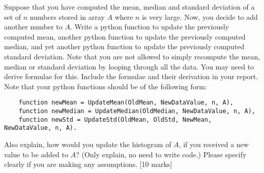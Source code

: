 \begin{que}
	Suppose that you have computed the mean, median and standard deviation of a
	set of $n$ numbers stored in array $A$ where $n$ is very large. Now, you decide
	to add another number to $A$. Write a python function to update the
	previously computed mean, another python function to update the previously
	computed median, and yet another python function to update the previously
	computed standard deviation. Note that you are not allowed to simply
	recompute the mean, median or standard deviation by looping through all the
	data. You may need to derive formulae for this. Include the formulae and
	their derivation in your report. Note that your python functions should be
	of the following form:

	\begin{verbatim}
	function newMean = UpdateMean(OldMean, NewDataValue, n, A),
	function newMedian = UpdateMedian(OldMedian, NewDataValue, n, A),
	function newStd = UpdateStd(OldMean, OldStd, NewMean, NewDataValue, n, A).
	\end{verbatim}

	Also explain, how would you update the histogram of $A$, if you received
	a new value to be added to $A$? (Only explain, no need to write code.)
	Please specify clearly if you are making any assumptions.
	\hspace*{\fill}[10 marks]
\end{que}


